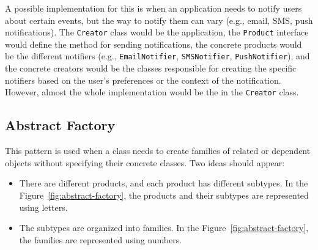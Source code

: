 A possible implementation for this is when an application needs to notify users about certain events, but the way to notify them can vary (e.g., email, SMS, push notifications). The \texttt{Creator} class would be the application, the \texttt{Product} interface would define the method for sending notifications, the concrete products would be the different notifiers (e.g., \texttt{EmailNotifier}, \texttt{SMSNotifier}, \texttt{PushNotifier}), and the concrete creators would be the classes responsible for creating the specific notifiers based on the user's preferences or the context of the notification. However, almost the whole implementation would be the in the \texttt{Creator} class.


\subsection{Abstract Factory}

This pattern is used when a class needs to create families of related or dependent objects without specifying their concrete classes. Two ideas should appear:
\begin{itemize}
    \item There are different products, and each product has different subtypes. In the Figure~\ref{fig:abstract-factory}, the products and their subtypes are represented using letters.
    \item The subtypes are organized into families. In the Figure~\ref{fig:abstract-factory}, the families are represented using numbers.
\end{itemize}

